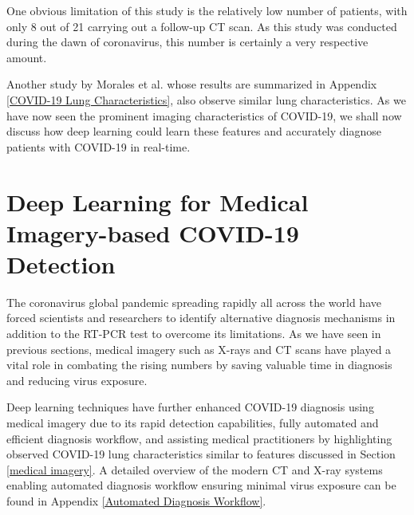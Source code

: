 \vspace{-2em}
One obvious limitation of this study is the relatively low number of 
patients, with only 8 out of 21 carrying out a follow-up CT scan. As this study
was conducted during the dawn of coronavirus, this number is certainly a 
very respective amount.

Another study by Morales et al. whose results are summarized in Appendix \ref{COVID-19 Lung Characteristics}, also observe similar lung characteristics. As we have now seen the prominent imaging characteristics of 
COVID-19, we shall now discuss how deep learning could learn these 
features and accurately diagnose patients with COVID-19 in real-time. 

\section{Deep Learning for Medical Imagery-based COVID-19 Detection}

The coronavirus global pandemic spreading rapidly all across the world have 
forced scientists and researchers to identify alternative 
diagnosis mechanisms in addition to the RT-PCR test to overcome 
its limitations. As we have seen in previous sections, 
medical imagery such as X-rays and CT scans have played a 
vital role in combating the rising numbers by saving 
valuable time in diagnosis and reducing virus exposure.

Deep learning techniques have further enhanced COVID-19 diagnosis 
using medical imagery due to its rapid detection capabilities, 
fully automated and efficient diagnosis workflow, 
and assisting medical practitioners by highlighting observed 
COVID-19 lung characteristics similar to 
features discussed in Section \ref{medical imagery}. A detailed overview of the modern CT and X-ray systems enabling automated diagnosis workflow ensuring minimal virus exposure can be found in Appendix \ref{Automated Diagnosis Workflow}.


